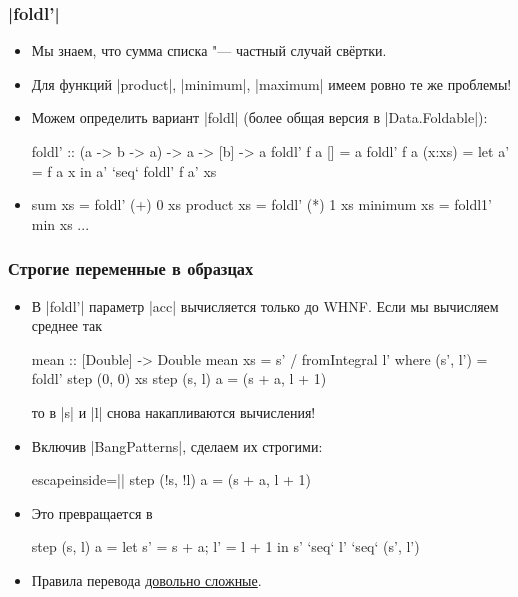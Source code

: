 \documentclass[11pt]{beamer}
\begin{document}
\begin{frame}[fragile]
  \frametitle{\haskinline|foldl'|}
  \begin{itemize}
    \item Мы знаем, что сумма списка "--- частный случай свёртки.
    \item Для функций \haskinline|product|, \haskinline|minimum|, \haskinline|maximum| имеем ровно те же проблемы!
    \item Можем определить вариант \haskinline|foldl| (более общая версия в \haskinline|Data.Foldable|):
          \begin{haskell}
            foldl' :: (a -> b -> a) -> a -> [b] -> a
            foldl' f a []     = a
            foldl' f a (x:xs) = let a' = f a x
                                in a' `seq` foldl' f a' xs
          \end{haskell}
    \item \pause
          \begin{haskell}
            sum xs = foldl' (+) 0 xs
            product xs = foldl' (*) 1 xs
            minimum xs = foldl1' min xs
            ...
          \end{haskell}
  \end{itemize}
\end{frame}

\begin{frame}[fragile]
  \frametitle{Строгие переменные в образцах}
  \begin{itemize}
    \item В \haskinline|foldl'| параметр \haskinline|acc| вычисляется только до WHNF. Если мы вычисляем среднее так
          \begin{haskell}
            mean :: [Double] -> Double
            mean xs = s' / fromIntegral l'
              where (s', l') = foldl' step (0, 0) xs
                    step (s, l) a = (s + a, l + 1)
          \end{haskell}
          то в \haskinline|s| и \haskinline|l| снова накапливаются вычисления!
          \pause
    \item Включив \haskinline|BangPatterns|, сделаем их строгими:
          \begin{haskell*}{escapeinside=||}
            step (!s, !l) a = (s + a, l + 1)
          \end{haskell*}
    \item Это превращается в
          \begin{haskell}
            step (s, l) a = let s' = s + a; l' = l + 1
                            in s' `seq` l' `seq` (s', l')
          \end{haskell}
    \item Правила перевода \href{https://downloads.haskell.org/~ghc/8.6.3/docs/html/users_guide/glasgow_exts.html#recursive-and-polymorphic-let-bindings}{довольно сложные}.
  \end{itemize}
\end{frame}
\end{document}
